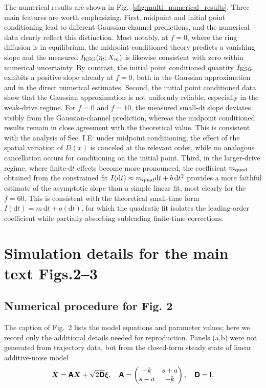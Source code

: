 The numerical results are shown in Fig.~\ref{sfig:multi_numerical_results}. Three main features are worth emphasizing. First, midpoint and initial point conditioning lead to different Gaussian-channel predictions, and the numerical data clearly reflect this distinction. Most notably, at $f=0$, where the ring diffusion is in equilibrium, the midpoint-conditioned theory predicts a vanishing slope and the measured $I_{\rm KSG}(\eta_t;X_m)$ is likewise consistent with zero within numerical uncertainty. By contrast, the initial point conditioned quantity $I_{\rm KSG}$ exhibits a positive slope already at $f=0$, both in the Gaussian approximation and in the direct numerical estimates. Second, the initial point conditioned data show that the Gaussian approximation is not uniformly reliable, especially in the weak-drive regime. For $f=0$ and $f=10$, the measured small-$\mathrm dt$ slope deviates visibly from the Gaussian-channel prediction, whereas the midpoint conditioned results remain in close agreement with the theoretical value. This is consistent with the analysis of Sec. I.E: under midpoint conditioning, the effect of the spatial variation of $D(x)$ is canceled at the relevant order, while no analogous cancellation occurs for conditioning on the initial point. Third, in the larger-drive regime, where finite-$\mathrm dt$ effects become more pronounced, the coefficient $m_{\rm quad}$ obtained from the constrained fit $I(\mathrm dt)\approx m_{\rm quad}\mathrm dt+b\,\mathrm dt^2$ provides a more faithful estimate of the asymptotic slope than a simple linear fit, most clearly for the $f=60$. This is consistent with the theoretical small-time form $I(\mathrm dt)=m\,\mathrm dt+o(\mathrm dt)$, for which the quadratic fit isolates the leading-order coefficient while partially absorbing subleading finite-time corrections.

\section{Simulation details for the main text Figs.2--3}
\vspace*{-0.6\baselineskip}

\subsection{Numerical procedure for Fig. 2}
\vspace*{-0.6\baselineskip}

The caption of Fig.~2 lists the model equations and parameter values; here we record only the additional details needed for reproduction. Panels (a,b) were not generated from trajectory data, but from the closed-form steady state of linear additive-noise model
\begin{equation}
    \dot{\bm X}=\boldsymbol{\mathsf{A}}\bm X+\sqrt{2\boldsymbol{\mathsf{D}}}\bm\xi,
    \quad
    \boldsymbol{\mathsf{A}}=
    \begin{pmatrix}
        -k & s+a \\
        s-a & -k
    \end{pmatrix},
    \quad
    \boldsymbol{\mathsf{D}}=\boldsymbol{\mathsf{I}}.
    \label{seq:linear_Langevin_fig2}
\end{equation}

